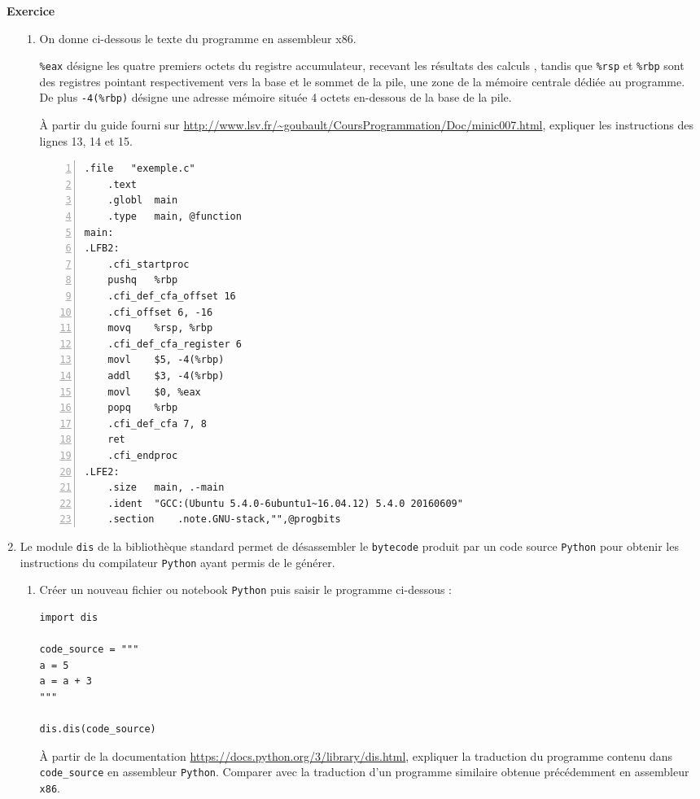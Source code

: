 \documentclass[a4paper, french, 11pt]{article}  %
\newcounter{def}
\newcounter{exercice}
\newenvironment{exercice}[1]
{\par \medskip   \addtocounter{exercice}{1} \noindent  
\begin{bclogo}[arrondi =0.1,   noborder = true, logo=\bccrayon, marge=4]{~\textbf{Exercice} \textbf{\theexercice} {\itshape #1} }  \par}
{
\end{bclogo}
 \par \bigskip }
\newcounter{prog}
\begin{document}
\begin{exercice}{}
\begin{enumerate}
\begin{enumerate}
\item On donne ci-dessous le texte du programme en assembleur x86. 

\verb+%eax+ désigne les quatre premiers octets du registre accumulateur, recevant les résultats des calculs , tandis que \verb+%rsp+ et \verb+%rbp+  sont des registres pointant respectivement vers la base et le sommet de la pile, une zone de la mémoire centrale dédiée au programme.  De plus \verb+-4(%rbp)+ désigne une adresse mémoire située 4 octets en-dessous de  la base de la pile.

À partir du guide fourni sur \url{http://www.lsv.fr/~goubault/CoursProgrammation/Doc/minic007.html}, expliquer les instructions des lignes 13, 14 et 15.


\begin{lstlisting}[numbers=left, language={[x86masm]Assembler}]
	.file	"exemple.c"
	.text
	.globl	main
	.type	main, @function
main:
.LFB2:
	.cfi_startproc
	pushq	%rbp
	.cfi_def_cfa_offset 16
	.cfi_offset 6, -16
	movq	%rsp, %rbp
	.cfi_def_cfa_register 6
	movl	$5, -4(%rbp)
	addl	$3, -4(%rbp)
	movl	$0, %eax
	popq	%rbp
	.cfi_def_cfa 7, 8
	ret
	.cfi_endproc
.LFE2:
	.size	main, .-main
	.ident	"GCC:(Ubuntu 5.4.0-6ubuntu1~16.04.12) 5.4.0 20160609"
	.section	.note.GNU-stack,"",@progbits
\end{lstlisting}

\end{enumerate}

\item 




Le module \texttt{dis} de la bibliothèque standard  permet de désassembler le \texttt{bytecode} produit par un code source \texttt{Python} pour obtenir les instructions du compilateur \texttt{Python} ayant permis de le générer.

\begin{enumerate}
\item Créer un nouveau fichier ou notebook \texttt{Python} puis saisir le programme ci-dessous :

\begin{lstlisting}[style=rond]
import dis 

code_source = """
a = 5
a = a + 3
"""

dis.dis(code_source)
\end{lstlisting}

À partir de la documentation \url{https://docs.python.org/3/library/dis.html}, expliquer la traduction du programme contenu dans \verb+code_source+ en assembleur \texttt{Python}. Comparer avec la traduction d'un programme similaire obtenue précédemment  en assembleur \texttt{x86}.


\end{enumerate}
\end{enumerate}
\end{exercice}
\end{document}
